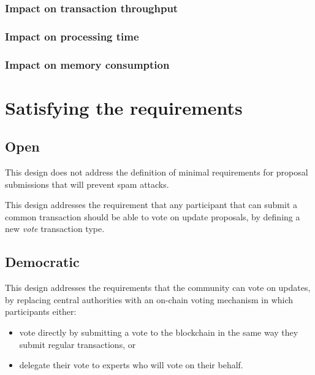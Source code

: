 \documentclass[11pt,a4paper]{article}
\begin{document}
\subsubsection{Impact on transaction throughput}
\label{sec:impact-trans-thro}

\subsubsection{Impact on processing time}
\label{sec:impact-proc-time}

\subsubsection{Impact on memory consumption}
\label{sec:impact-memory-cons}

\section{Satisfying the requirements}
\label{sec:satisfy-requ}


\subsection{Open}
\label{sec:sat-open}

This design does not address the definition of minimal requirements for proposal
submissions that will prevent spam attacks.

This design addresses the requirement that any participant that can submit a
common transaction should be able to vote on update proposals, by
defining a new \emph{vote} transaction type.

\subsection{Democratic}
\label{sec:sat-decentr-decis-making}

This design addresses the requirements that the community can vote on updates,
by replacing central authorities with an on-chain voting mechanism in which
participants either:
\begin{itemize}
\item vote directly by submitting a vote to the blockchain in the same way they
  submit regular transactions, or
\item delegate their vote to experts who will vote on their behalf.
\end{itemize}
\end{document}
